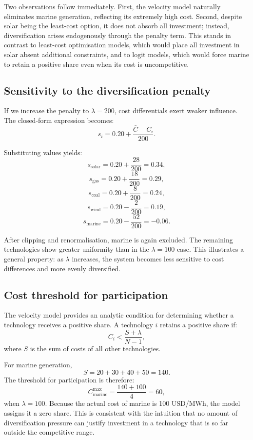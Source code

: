 \documentclass[preprint,authoryear,12pt]{elsarticle}
\begin{document}
Two observations follow immediately. First, the velocity model naturally eliminates marine
generation, reflecting its extremely high cost. Second, despite solar being the least-cost option,
it does not absorb all investment; instead, diversification arises endogenously through the penalty
term. This stands in contrast to least-cost optimisation models, which would place all investment
in solar absent additional constraints, and to logit models, which would force marine to retain a
positive share even when its cost is uncompetitive.

\subsection{Sensitivity to the diversification penalty}

If we increase the penalty to $\lambda = 200$, cost differentials exert weaker influence. The
closed-form expression becomes:
\[
    s_i = 0.20 + \frac{\bar{C} - C_i}{200}.
\]

Substituting values yields:
\[
    s_{\text{solar}} = 0.20 + \frac{28}{200} = 0.34,
\]
\[
    s_{\text{gas}} = 0.20 + \frac{18}{200} = 0.29,
\]
\[
    s_{\text{coal}} = 0.20 + \frac{8}{200} = 0.24,
\]
\[
    s_{\text{wind}} = 0.20 - \frac{2}{200} = 0.19,
\]
\[
    s_{\text{marine}} = 0.20 - \frac{52}{200} = -0.06.
\]

After clipping and renormalisation, marine is again excluded. The remaining technologies show
greater uniformity than in the $\lambda = 100$ case. This illustrates a general property: as $\lambda$
increases, the system becomes less sensitive to cost differences and more evenly diversified.

\subsection{Cost threshold for participation}

The velocity model provides an analytic condition for determining whether a technology receives a
positive share. A technology $i$ retains a positive share if:
\begin{equation}
    C_i < \frac{S + \lambda}{N-1},
    \label{eq:threshold_condition_repeat}
\end{equation}
where $S$ is the sum of costs of all other technologies.

For marine generation,
\[
    S = 20 + 30 + 40 + 50 = 140.
\]
The threshold for participation is therefore:
\[
    C_{\text{marine}}^{\max} = \frac{140 + 100}{4} = 60,
\]
when $\lambda = 100$. Because the actual cost of marine is 100 USD/MWh, the model assigns it a
zero share. This is consistent with the intuition that no amount of diversification pressure can
justify investment in a technology that is so far outside the competitive range.
\end{document}
